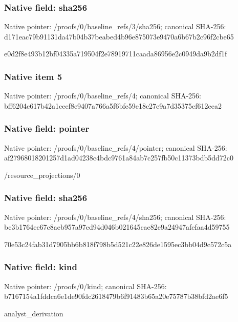 \documentclass[10pt,a4paper]{article}
\begin{document}
\subsubsection{Native field: sha256}
Native pointer: /proofs/0/baseline\_\allowbreak{}refs/3/sha256; canonical SHA-256: d171eac79b91131da47b04b37beabed4b96e875073e9470a6b67b2c96f2cbe65

\begingroup\raggedright\sloppy e0d2f8e493b12bf04335a719504f2e78919711caada86956e2c0949da9b2df1f\par\endgroup

\subsubsection{Native item 5}
Native pointer: /proofs/0/baseline\_\allowbreak{}refs/4; canonical SHA-256: bff6204c617b42a1ceef8e9407a766a5f6bfe59e18c27e9a7d35375ef612eea2

\subsubsection{Native field: pointer}
Native pointer: /proofs/0/baseline\_\allowbreak{}refs/4/pointer; canonical SHA-256: af27968018201257d1ad04238c4bdc9761a84ab7c257fb50c11373bdb5dd72c0

\begingroup\raggedright\sloppy /\allowbreak{}resource\_\allowbreak{}projections/\allowbreak{}0\par\endgroup

\subsubsection{Native field: sha256}
Native pointer: /proofs/0/baseline\_\allowbreak{}refs/4/sha256; canonical SHA-256: bc3b1764ee67c8aeb957a97ed94d046b021645cae82e9a24947afefaa4d59755

\begingroup\raggedright\sloppy 70e53c24fab31d7905bb6b818f798b5d521c22e826de1595ec3bb04d9c572c5a\par\endgroup

\subsubsection{Native field: kind}
Native pointer: /proofs/0/kind; canonical SHA-256: b7167154a1fddca6e1de90fdc2618479b6f91483b65a20e75787b38bfd2ae6f5

\begingroup\raggedright\sloppy analyst\_\allowbreak{}derivation\par\endgroup
\end{document}
